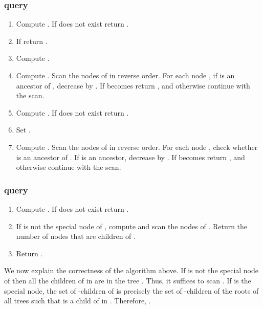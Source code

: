 \documentclass[12pt]{article}
\begin{document}
\subsubsection{ query}
\begin{enumerate}
\item
Compute .
If  does not exist return .
\item
If  return .
\item
Compute .
\item
Compute . Scan the nodes of  in reverse order.
For each node , if  is an ancestor of , decrease  by .
If  becomes  return , and otherwise continue with the scan.
\item
Compute .
If  does not exist return .
\item
Set .
\item
Compute . Scan the nodes of  in reverse order.
For each node , check whether  is an ancestor of .
If  is an ancestor, decrease  by .
If  becomes  return , and otherwise continue with the scan.
\end{enumerate}

\subsubsection{ query}
\begin{enumerate}
\item
Compute .
If  does not exist return .
\item
If  is not the special node of ,
compute  and scan the nodes of .
Return the number of nodes that are children of .
\item
Return .
\end{enumerate}

We now explain the correctness of the algorithm above.
If  is not the special node of  then all the children of 
in  are in the tree . Thus, it suffices to scan .
If  is the special node, the set of -children of  is
precisely the set of -children of the roots of all trees 
such that  is a child of  in .
Therefore, .
\end{document}
